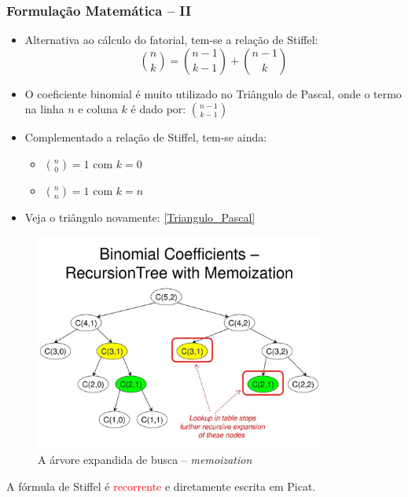 \begin{frame}[fragile]

\frametitle{Formulação Matemática -- II}

\label{Stiffel}

\begin{itemize}
  \item Alternativa ao cálculo do fatorial, tem-se a relação de Stiffel:
 $$ {n\choose k}={n-1\choose k-1}+{n-1\choose k}$$  
    

  \pause
  \item  O coeficiente binomial é muito utilizado no Triângulo de Pascal, onde o 
  termo na linha $n$ e coluna $k$ é  dado por: ${n-1 \choose k-1}$
  
  \pause
  \item Complementado a relação de Stiffel, tem-se ainda:
  \begin{itemize}
  \item $ {n\choose 0}= 1$ com $k=0$
  \item $ {n\choose n}= 1$ com $k=n$
  \end{itemize}

  \item Veja o triângulo novamente: \ref{Triangulo_Pascal}
     
\end{itemize}   
    
\end{frame}


\begin{frame}[fragile]


\begin{figure}[!htb]
\centering
\includegraphics[width=0.850\textwidth, height=0.650\textheight]{figures/Binomial_Coefficients_RecursionTree_Memoization.jpg}
\caption{A árvore expandida de busca -- \textit{memoization}}
\end{figure}
    
  \pause
  A fórmula de Stiffel é \textcolor{red}{recorrente} e diretamente escrita em Picat.
 \end{frame}




